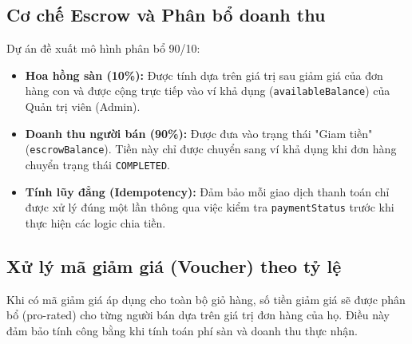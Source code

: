 \documentclass[../main.tex]{subfiles}
\begin{document}
\subsection{Cơ chế Escrow và Phân bổ doanh thu}
Dự án đề xuất mô hình phân bổ 90/10:
\begin{itemize}
    \item \textbf{Hoa hồng sàn (10\%):} Được tính dựa trên giá trị sau giảm giá của đơn hàng con và được cộng trực tiếp vào ví khả dụng (\texttt{availableBalance}) của Quản trị viên (Admin).
    \item \textbf{Doanh thu người bán (90\%):} Được đưa vào trạng thái "Giam tiền" (\texttt{escrowBalance}). Tiền này chỉ được chuyển sang ví khả dụng khi đơn hàng chuyển trạng thái \texttt{COMPLETED}.
    \item \textbf{Tính lũy đẳng (Idempotency):} Đảm bảo mỗi giao dịch thanh toán chỉ được xử lý đúng một lần thông qua việc kiểm tra \texttt{paymentStatus} trước khi thực hiện các logic chia tiền.
\end{itemize}

\subsection{Xử lý mã giảm giá (Voucher) theo tỷ lệ}
Khi có mã giảm giá áp dụng cho toàn bộ giỏ hàng, số tiền giảm giá sẽ được phân bổ (pro-rated) cho từng người bán dựa trên giá trị đơn hàng của họ. Điều này đảm bảo tính công bằng khi tính toán phí sàn và doanh thu thực nhận.
\end{document}
